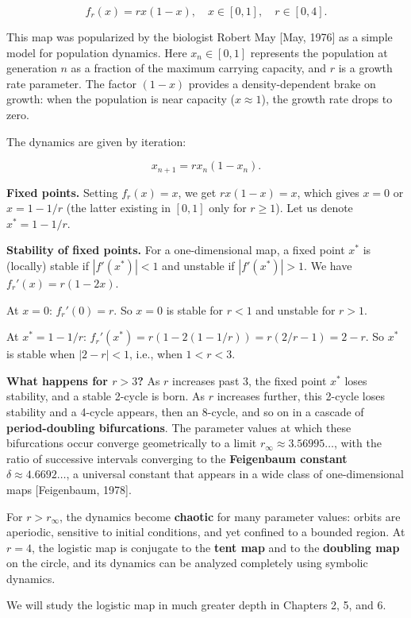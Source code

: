 \[
f_r(x) = rx(1 - x), \quad x \in [0, 1], \quad r \in [0, 4].
\]

This map was popularized by the biologist Robert May [May, 1976] as a simple model for population dynamics. Here $x_n \in [0, 1]$ represents the population at generation $n$ as a fraction of the maximum carrying capacity, and $r$ is a growth rate parameter. The factor $(1-x)$ provides a density-dependent brake on growth: when the population is near capacity ($x \approx 1$), the growth rate drops to zero.

The dynamics are given by iteration:

\[
x_{n+1} = rx_n(1 - x_n).
\]

\textbf{Fixed points.} Setting $f_r(x) = x$, we get $rx(1-x) = x$, which gives $x = 0$ or $x = 1 - 1/r$ (the latter existing in $[0,1]$ only for $r \geq 1$). Let us denote $x^* = 1 - 1/r$.

\textbf{Stability of fixed points.} For a one-dimensional map, a fixed point $x^*$ is (locally) stable if $|f'(x^*)| < 1$ and unstable if $|f'(x^*)| > 1$. We have $f_r'(x) = r(1-2x)$.

At $x = 0$: $f_r'(0) = r$. So $x = 0$ is stable for $r < 1$ and unstable for $r > 1$.

At $x^* = 1 - 1/r$: $f_r'(x^*) = r(1 - 2(1 - 1/r)) = r(2/r - 1) = 2 - r$. So $x^*$ is stable when $|2 - r| < 1$, i.e., when $1 < r < 3$.

\textbf{What happens for $r > 3$?} As $r$ increases past $3$, the fixed point $x^*$ loses stability, and a stable 2-cycle is born. As $r$ increases further, this 2-cycle loses stability and a 4-cycle appears, then an 8-cycle, and so on in a cascade of \textbf{period-doubling bifurcations}. The parameter values at which these bifurcations occur converge geometrically to a limit $r_\infty \approx 3.56995\ldots$, with the ratio of successive intervals converging to the \textbf{Feigenbaum constant} $\delta \approx 4.6692\ldots$, a universal constant that appears in a wide class of one-dimensional maps [Feigenbaum, 1978].

For $r > r_\infty$, the dynamics become \textbf{chaotic} for many parameter values: orbits are aperiodic, sensitive to initial conditions, and yet confined to a bounded region. At $r = 4$, the logistic map is conjugate to the \textbf{tent map} and to the \textbf{doubling map} on the circle, and its dynamics can be analyzed completely using symbolic dynamics.

We will study the logistic map in much greater depth in Chapters 2, 5, and 6.

